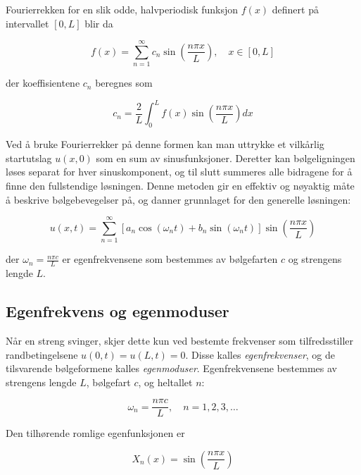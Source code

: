 Fourierrekken for en slik odde, halvperiodisk funksjon $f(x)$ definert på intervallet $[0,L]$ blir da

\begin{equation*}
f(x) = \sum_{n=1}^{\infty} c_n \sin\left(\frac{n\pi x}{L}\right), \quad x \in [0,L]
\end{equation*}

der koeffisientene $c_n$ beregnes som

\begin{equation*}
c_n = \frac{2}{L} \int_{0}^{L} f(x) \sin\left(\frac{n\pi x}{L}\right) dx
\end{equation*}

Ved å bruke Fourierrekker på denne formen kan man uttrykke et vilkårlig startutslag $u(x,0)$ som en sum av sinusfunksjoner.  
Deretter kan bølgeligningen løses separat for hver sinuskomponent, og til slutt summeres alle bidragene for å finne den fullstendige løsningen.  
Denne metoden gir en effektiv og nøyaktig måte å beskrive bølgebevegelser på, og danner grunnlaget for den generelle løsningen:

\begin{equation*}
u(x,t) = \sum_{n=1}^{\infty} \left[a_n \cos(\omega_n t) + b_n \sin(\omega_n t)\right] \sin\left(\frac{n\pi x}{L}\right)
\end{equation*}

der $\omega_n = \frac{n\pi c}{L}$ er egenfrekvensene som bestemmes av bølgefarten $c$ og strengens lengde $L$.
\clearpage
\subsection{Egenfrekvens og egenmoduser}

Når en streng svinger, skjer dette kun ved bestemte frekvenser som tilfredsstiller randbetingelsene $u(0,t)=u(L,t)=0$.  
Disse kalles \textit{egenfrekvenser}, og de tilsvarende bølgeformene kalles \textit{egenmoduser}.  
Egenfrekvensene bestemmes av strengens lengde $L$, bølgefart $c$, og heltallet $n$:

\begin{equation*}
\omega_n = \frac{n\pi c}{L}, \quad n = 1,2,3,\dots
\end{equation*}

Den tilhørende romlige egenfunksjonen er

\begin{equation*}
X_n(x) = \sin\left(\frac{n\pi x}{L}\right)
\end{equation*}

